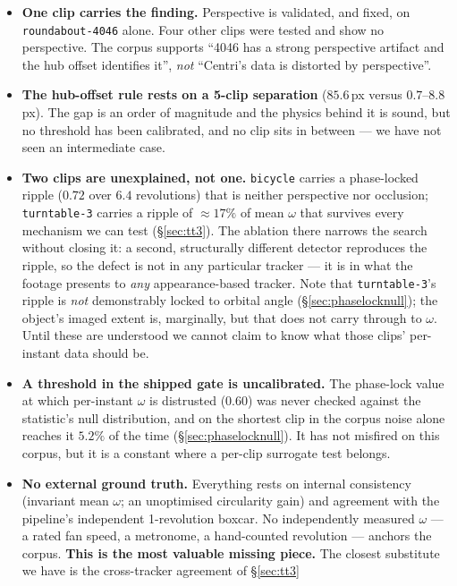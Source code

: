 \documentclass[11pt,a4paper]{article}
\begin{document}
\begin{itemize}
  \item \textbf{One clip carries the finding.} Perspective is validated, and fixed, on
  \texttt{roundabout-4046} alone. Four other clips were tested and show no perspective. The
  corpus supports ``4046 has a strong perspective artifact and the hub offset identifies it'',
  \emph{not} ``Centri's data is distorted by perspective''.
  \item \textbf{The hub-offset rule rests on a 5-clip separation} ($85.6$\,px versus
  $0.7$--$8.8$\,px). The gap is an order of magnitude and the physics behind it is sound, but no
  threshold has been calibrated, and no clip sits in between --- we have not seen an
  intermediate case.
  \item \textbf{Two clips are unexplained, not one.} \texttt{bicycle} carries a phase-locked
  ripple ($0.72$ over $6.4$ revolutions) that is neither perspective nor occlusion;
  \texttt{turntable-3} carries a ripple of $\approx17\%$ of mean $\omega$ that survives every
  mechanism we can test (\S\ref{sec:tt3}). The ablation there narrows the search without closing
  it: a second, structurally different detector reproduces the ripple, so the defect is not in any
  particular tracker --- it is in what the footage presents to \emph{any} appearance-based tracker.
  Note that \texttt{turntable-3}'s ripple is \emph{not} demonstrably locked to orbital angle
  (\S\ref{sec:phaselocknull}); the object's imaged extent is, marginally, but that does not carry
  through to $\omega$. Until these are understood we cannot claim to know what those clips'
  per-instant data should be.
  \item \textbf{A threshold in the shipped gate is uncalibrated.} The phase-lock value at which
  per-instant $\omega$ is distrusted ($0.60$) was never checked against the statistic's null
  distribution, and on the shortest clip in the corpus noise alone reaches it $5.2\%$ of the time
  (\S\ref{sec:phaselocknull}). It has not misfired on this corpus, but it is a constant where a
  per-clip surrogate test belongs.
  \item \textbf{No external ground truth.} Everything rests on internal consistency (invariant
  mean $\omega$; an unoptimised circularity gain) and agreement with the pipeline's independent
  1-revolution boxcar. No independently measured $\omega$ --- a rated fan speed, a metronome, a
  hand-counted revolution --- anchors the corpus. \textbf{This is the most valuable missing
  piece.} The closest substitute we have is the cross-tracker agreement of \S\ref{sec:tt3}

\end{itemize}
\end{document}
